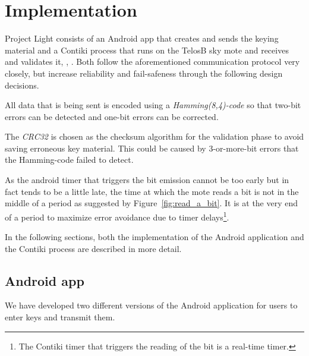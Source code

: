\documentclass{sig-alternate} %
\begin{document}
\section{Implementation}
\label{sec:implementation}

Project Light consists of an Android app that creates and sends the keying material and a Contiki process that runs on the TelosB sky mote and receives and validates it, \cite{dunkels04contiki}, \cite{telosb}.
Both follow the aforementioned communication protocol very closely, but increase reliability and fail-safeness through the following design decisions.

All data that is being sent is encoded using a \textit{Hamming(8,4)-code} so that two-bit errors can be detected and one-bit errors can be corrected.

The \textit{CRC32} is chosen as the checksum algorithm for the validation phase to avoid saving erroneous key material.
This could be caused by 3-or-more-bit errors that the Hamming-code failed to detect.

As the android timer that triggers the bit emission cannot be too early but in fact tends to be a little late\cite{mongia2010reliable}, the time at which the mote reads a bit is not in the middle of a period as suggested by Figure~\ref{fig:read_a_bit}.
It is at the very end of a period to maximize error avoidance due to timer delays\footnote{The Contiki timer that triggers the reading of the bit is a real-time timer.}.

In the following sections, both the implementation of the Android application and the Contiki process are described in more detail.

\subsection{Android app}
\label{sub:android_app}

We have developed two different versions of the Android application for users to enter keys and transmit them.

\end{document}
